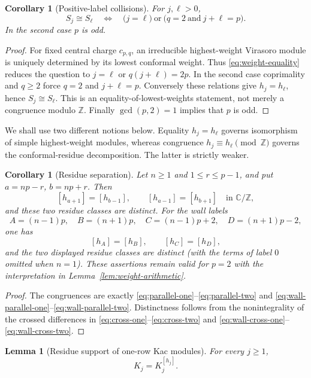\documentclass[12pt,leqno]{amsart}
\numberwithin{equation}{section}
\newtheorem{lem}[thm]{Lemma}
\newtheorem{cor}[thm]{Corollary}
\def\Z{\mathbb{Z}}
\def\C{\mathbb{C}}
\begin{document}
\begin{cor}[Positive-label collisions]\label{cor:positive-label-collisions}
For $j,\ell>0$,
\[
 S_j\cong S_\ell
 \quad\Longleftrightarrow\quad
 \bigl(j=\ell\bigr)
 \ \text{or}\ 
 \bigl(q=2\ \text{and}\ j+\ell=p\bigr).
\]
In the second case $p$ is odd.
\end{cor}

\begin{proof}
For fixed central charge $c_{p,q}$, an irreducible highest-weight Virasoro
module is uniquely determined by its lowest conformal weight.  Thus \eqref{eq:weight-equality} reduces
the question to $j=\ell$ or $q(j+\ell)=2p$.  In the second case
coprimality and $q\ge2$ force $q=2$ and $j+\ell=p$.  Conversely these
relations give $h_j=h_\ell$, hence $S_j\cong S_\ell$.  This is an
equality-of-lowest-weights statement, not merely a congruence modulo
$\Z$.  Finally $\gcd(p,2)=1$ implies that $p$ is odd.
\end{proof}

We shall use two different notions below.  Equality $h_j=h_\ell$ governs
isomorphism of simple highest-weight modules, whereas congruence
$h_j\equiv h_\ell\pmod{\Z}$ governs the conformal-residue decomposition.
The latter is strictly weaker.

\begin{cor}[Residue separation]\label{cor:residue-separation}
Let $n\ge1$ and $1\le r\le p-1$, and put $a=np-r$, $b=np+r$.  Then
\[
 [h_{a+1}]=[h_{b-1}],\qquad
 [h_{a-1}]=[h_{b+1}]
 \quad\text{in }\C/\Z,
\]
and these two residue classes are distinct.  For the wall labels
\[
 A=(n-1)p,\quad B=(n+1)p,\quad
 C=(n-1)p+2,\quad D=(n+1)p-2,
\]
one has
\[
 [h_A]=[h_B],\qquad [h_C]=[h_D],
\]
and the two displayed residue classes are distinct (with the terms of
label $0$ omitted when $n=1$).  These assertions remain valid for $p=2$
with the interpretation in Lemma~\ref{lem:weight-arithmetic}.
\end{cor}

\begin{proof}
The congruences are exactly
\eqref{eq:parallel-one}--\eqref{eq:parallel-two} and
\eqref{eq:wall-parallel-one}--\eqref{eq:wall-parallel-two}.  Distinctness
follows from the nonintegrality of the crossed differences in
\eqref{eq:cross-one}--\eqref{eq:cross-two} and
\eqref{eq:wall-cross-one}--\eqref{eq:wall-cross-two}.
\end{proof}

\begin{lem}[Residue support of one-row Kac modules]\label{lem:Kac-residue-support}
For every $j\ge1$,
\[
 K_j=K_j^{[h_j]}.
\]
\end{lem}
\end{document}
